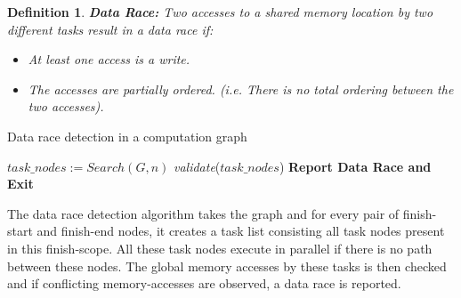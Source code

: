 \documentclass[10pt]{article}
\newtheorem{definition}{Definition}
\begin{document}
\begin{definition}
\textbf{Data Race:}
Two accesses to a shared memory location by two different tasks result in a data race if:
\begin{itemize}
\item At least one access is a write.
\item The accesses are partially ordered. (i.e. There is no total ordering between the two accesses).
\end{itemize}
\end{definition}


\begin{algorithm}
\caption{Data race detection in a computation graph } 
\begin{algorithmic}[h]
			\State $task\_nodes := Search(G, n)$
			\State \textit{validate}($task\_nodes$)
		\EndFor
	\EndFunction  
  \State \textbf{Report Data Race and Exit} \label{loc:datarace}
  \EndIf
  \EndFor
  \EndFor
  \EndFunction
\end{algorithmic}
\end{algorithm}

The data race detection algorithm takes the graph and for every pair of finish-start and finish-end nodes, it creates a task list consisting all task nodes present in this finish-scope. All these task nodes execute in parallel if there is no path between these nodes. The global memory accesses by these tasks is then checked and if conflicting memory-accesses are observed, a data race is reported.
\end{document}
